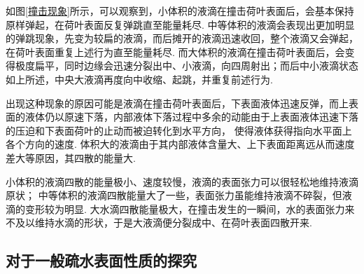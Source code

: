 \documentclass[a4paper,12pt]{article}%
\begin{document}
\begin{spacing}{1.528}%
如图\ref{撞击现象}所示，可以观察到，小体积的液滴在撞击荷叶表面后，会基本保持原样弹起，在荷叶表面反复弹跳直至能量耗尽. 
中等体积的液滴会表现出更加明显的弹跳现象，先变为较扁的液滴，而后摊开的液滴迅速收回，整个液滴又会弹起，在荷叶表面重复上述行为直至能量耗尽. 
而大体积的液滴在撞击荷叶表面后，会变得极度扁平，同时边缘会迅速分裂出中、小液滴，向四周射出；而后中小液滴状态如上所述，中央大液滴再度向中收缩、起跳，并重复前述行为. 

出现这种现象的原因可能是液滴在撞击荷叶表面后，下表面液体迅速反弹，而上表面的液体仍以原速下落，内部液体下落过程中多余的动能由于上表面液体迅速下落的压迫和下表面荷叶的止动而被迫转化到水平方向，
使得液体获得指向水平面上各个方向的速度. 
体积大的液滴由于其内部液体含量大、上下表面距离远从而速度差大等原因，其四散的能量大. 

小体积的液滴四散的能量极小、速度较慢，液滴的表面张力可以很轻松地维持液滴原状；
中等体积的液滴四散能量大了一些，表面张力虽能维持液滴不碎裂，但液滴的变形较为明显. 
大水滴四散能量极大，在撞击发生的一瞬间，水的表面张力来不及以维持水滴的形状，于是大液滴便分裂成中、在荷叶表面四散开来. 
\end{spacing}

\subsection{对于一般疏水表面性质的探究}\label{yibanbiaomian}
\end{document}

